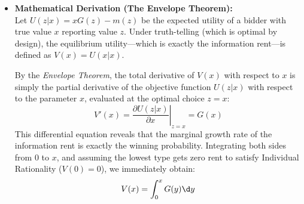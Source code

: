{\begin{itemize}
\begin{center}
\end{center}

  \item \textbf{Mathematical Derivation (The Envelope Theorem):} \\
  Let $U(z | x) = x G(z) - m(z)$ be the expected utility of a bidder with true value $x$ reporting value $z$. 
  Under truth-telling (which is optimal by design), the equilibrium utility—which is exactly the information rent—is defined as $V(x) = U(x | x)$. 
  
  By the \textit{Envelope Theorem}, the total derivative of $V(x)$ with respect to $x$ is simply the partial derivative of the objective function $U(z | x)$ with respect to the parameter $x$, evaluated at the optimal choice $z=x$:
  \[
    V'(x) = \left. \frac{\partial U(z | x)}{\partial x} \right|_{z=x} = G(x)
  \]
  This differential equation reveals that the marginal growth rate of the information rent is exactly the winning probability. Integrating both sides from $0$ to $x$, and assuming the lowest type gets zero rent to satisfy Individual Rationality ($V(0) = 0$), we immediately obtain:
  \[
    V(x) = \int_0^x G(y) \d y
  \]
  \end{itemize}
}

